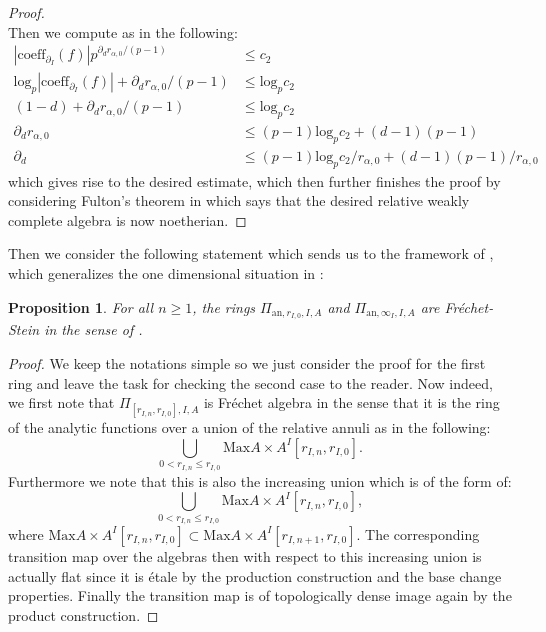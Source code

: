 \documentclass[12pt]{amsart}
\newtheorem{proposition}[theorem]{Proposition}
\theoremstyle{definition}
\numberwithin{equation}{section}
\begin{document}
\begin{proof}
\begin{displaymath}
\end{displaymath}
Then we compute as in the following:
\begin{align}
|\mathrm{coeff}_{\partial_I}(f)|p^{\partial_d r_{\alpha,0}/(p-1)}&\leq c_2\\	
\mathrm{log}_p|\mathrm{coeff}_{\partial_I}(f)|+\partial_d r_{\alpha,0}/(p-1)&\leq \mathrm{log}_pc_2\\
(1-d)+\partial_d r_{\alpha,0}/(p-1)&\leq \mathrm{log}_pc_2\\
\partial_d r_{\alpha,0}&\leq (p-1)\mathrm{log}_pc_2+(d-1)(p-1)\\
\partial_d &\leq (p-1)\mathrm{log}_pc_2/r_{\alpha,0}+(d-1)(p-1)/r_{\alpha,0}
\end{align}
which gives rise to the desired estimate, which then further finishes the proof by considering Fulton's theorem in \cite{Ful1} which says that the desired relative weakly complete algebra is now noetherian.
\end{proof}




 \indent Then we consider the following statement which sends us to the framework of \cite{ST1}, which generalizes the one dimensional situation in \cite[Section 2.1]{KPX}:
 
\begin{proposition}
For all $n\geq 1$, the rings $\Pi_{\mathrm{an},r_{I,0},I,A}$ and $\Pi_{\mathrm{an},\infty_I,I,A}$ are Fr\'echet-Stein in the sense of \cite{ST1}.
\end{proposition}


\begin{proof}
We keep the notations simple so we just consider the proof for the first ring and leave the task for checking the second case to the reader. Now indeed, we first note that $\Pi_{[r_{I,n},r_{I,0}],I,A}$ is Fr\'echet algebra in the sense that it is the ring of the analytic functions over a union of the relative annuli as in the following:
\begin{displaymath}
\bigcup_{0<r_{I,n}\leq r_{I,0}} \mathrm{Max}A\times A^I[r_{I,n},r_{I,0}]. 
\end{displaymath}
Furthermore we note that this is also the increasing union which is of the form of:
\begin{displaymath}
\bigcup_{0<r_{I,n}\leq r_{I,0}} \mathrm{Max}A\times A^I[r_{I,n},r_{I,0}],
\end{displaymath}
where $ \mathrm{Max}A\times A^I[r_{I,n},r_{I,0}]\subset  \mathrm{Max}A\times A^I[r_{I,n+1},r_{I,0}]$. The corresponding transition map over the algebras then with respect to this increasing union is actually flat since it is \'etale by the production construction and the base change properties. Finally the transition map is of topologically dense image again by the product construction.	
\end{proof}
\end{document}
